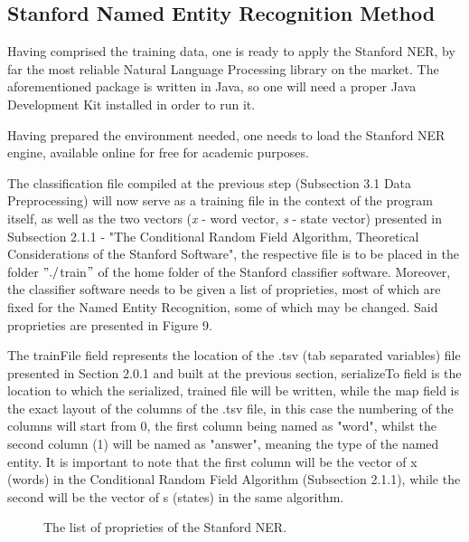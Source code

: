 \documentclass[12pt,a4paper]{article}
\begin{document}
\subsection{Stanford Named Entity Recognition Method}

\qquad \quad Having comprised the training data, one is ready to apply the Stanford NER, by far the most reliable Natural Language Processing library on the market. The aforementioned package is written in Java, so one will need a proper Java Development Kit installed in order to run it.

\qquad Having prepared the environment needed, one needs to load the Stanford NER engine, available online for free for academic purposes. 

\qquad The classification file compiled at the previous step (Subsection 3.1 Data Preprocessing) will now serve as a training file in the context of the program itself, as well as the two vectors (\textit{x} - word vector, \textit{s} - state vector) presented in Subsection 2.1.1 - "The Conditional Random Field Algorithm, Theoretical Considerations of the Stanford Software", the respective file is to be placed in the folder $"./$train$"$ of the home folder of the Stanford classifier software. Moreover, the classifier software needs to be given a list of proprieties, most of which are fixed for the Named Entity Recognition, some of which may be changed. Said proprieties are presented in Figure 9.

\qquad The trainFile field represents the location of the .tsv (tab separated variables) file presented in Section 2.0.1 and built at the previous section, serializeTo field is the location to which the serialized, trained file will be written, while the map field is the exact layout of the columns of the .tsv file, in this case the numbering of the columns will start from 0, the first column being named as "word", whilst the second column (1) will be named as "answer", meaning the type of the named entity. It is important to note that the first column will be the vector of x (words) in the Conditional Random Field Algorithm (Subsection 2.1.1), while the second will be the vector of s (states) in the same algorithm.
\begin{figure}[h!]
\begin{center}
\end{center}
\caption{The list of proprieties of the Stanford NER.}
\end{figure}
\end{document}
